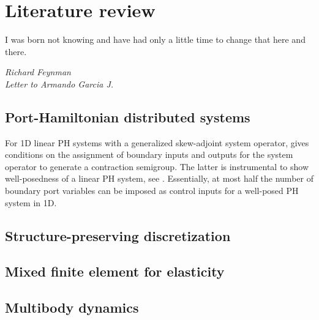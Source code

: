 \chapter[Literature review]{Literature review}

\epigraph{I was born not knowing and have had only a little time to change that here and there.}
{\textit{ Richard Feynman \\ Letter to Armando Garcia J.}}



\section{Port-Hamiltonian distributed systems}

 For 1D linear PH systems with a generalized skew-adjoint system operator, \cite{legorrec2005} gives conditions on the assignment of boundary inputs and outputs for the system operator to generate a contraction
semigroup. The latter is instrumental to show well-posedness of a linear PH
system, see \cite{zwart2012}. Essentially, at most half the number of boundary port variables
can be imposed as control inputs for a well-posed PH system in 1D.

\section{Structure-preserving discretization}

\section{Mixed finite element for elasticity}

\section{Multibody dynamics}